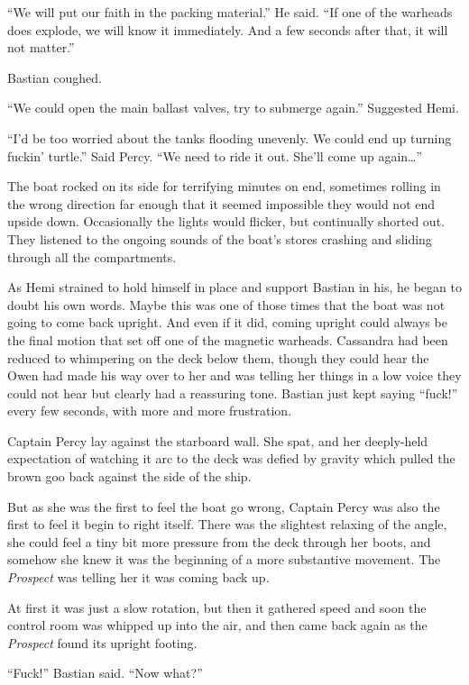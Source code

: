 \documentclass[]{scrbook}
\begin{document}
``We will put our faith in the packing material.'' He said. ``If one of
the warheads does explode, we will know it immediately. And a few
seconds after that, it will not matter.''

Bastian coughed.

``We could open the main ballast valves, try to submerge again.''
Suggested Hemi.

``I'd be too worried about the tanks flooding unevenly. We could end up
turning fuckin' turtle.'' Said Percy. ``We need to ride it out. She'll
come up again\ldots{}''

The boat rocked on its side for terrifying minutes on end, sometimes
rolling in the wrong direction far enough that it seemed impossible they
would not end upside down. Occasionally the lights would flicker, but
continually shorted out. They listened to the ongoing sounds of the
boat's stores crashing and sliding through all the compartments.

As Hemi strained to hold himself in place and support Bastian in his, he
began to doubt his own words. Maybe this was one of those times that the
boat was not going to come back upright. And even if it did, coming
upright could always be the final motion that set off one of the
magnetic warheads. Cassandra had been reduced to whimpering on the deck
below them, though they could hear the Owen had made his way over to her
and was telling her things in a low voice they could not hear but
clearly had a reassuring tone. Bastian just kept saying ``fuck!'' every
few seconds, with more and more frustration.

Captain Percy lay against the starboard wall. She spat, and her
deeply-held expectation of watching it arc to the deck was defied by
gravity which pulled the brown goo back against the side of the ship.

But as she was the first to feel the boat go wrong, Captain Percy was
also the first to feel it begin to right itself. There was the slightest
relaxing of the angle, she could feel a tiny bit more pressure from the
deck through her boots, and somehow she knew it was the beginning of a
more substantive movement. The \emph{Prospect} was telling her it was
coming back up.

At first it was just a slow rotation, but then it gathered speed and
soon the control room was whipped up into the air, and then came back
again as the \emph{Prospect} found its upright footing.

``Fuck!'' Bastian said. ``Now what?''
\end{document}
